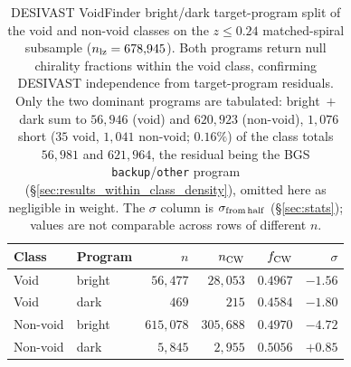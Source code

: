 \documentclass[aps,prd,twocolumn,superscriptaddress,showpacs,preprintnumbers,nofootinbib,longbibliography,floatfix]{revtex4-2}
\begin{document}
\begin{table}[ht]
\caption{DESIVAST VoidFinder bright/dark target-program split of
the void and non-void classes on the $z \leq 0.24$ matched-spiral
subsample ($n_{\rm lz} = 678{,}945$). Both programs return null
chirality fractions within the void class, confirming DESIVAST
independence from target-program residuals. Only the two dominant
programs are tabulated: bright~$+$~dark sum to $56{,}946$ (void) and
$620{,}923$ (non-void), $1{,}076$ short ($35$ void, $1{,}041$
non-void; $0.16\%$) of the class totals $56{,}981$ and $621{,}964$,
the residual being the BGS \texttt{backup}/\texttt{other} program
(\S\ref{sec:results_within_class_density}), omitted here as
negligible in weight. The $\sigma$ column
is $\sigma_{\rm from\,half}$ (\S\ref{sec:stats}); values are not
comparable across rows of different $n$.}
\label{tab:desivast_program_split}
\begin{ruledtabular}
\begin{tabular}{llrrrr}
Class & Program & $n$ & $n_{\rm CW}$ & $f_{\rm CW}$ & $\sigma$ \\
\hline
Void     & bright & $56{,}477$ & $28{,}053$ & $0.4967$ & $-1.56$ \\
Void     & dark   & $469$      & $215$      & $0.4584$ & $-1.80$ \\
Non-void & bright & $615{,}078$ & $305{,}688$ & $0.4970$ & $-4.72$ \\
Non-void & dark   & $5{,}845$  & $2{,}955$  & $0.5056$ & $+0.85$ \\
\end{tabular}
\end{ruledtabular}
\end{table}
\end{document}
